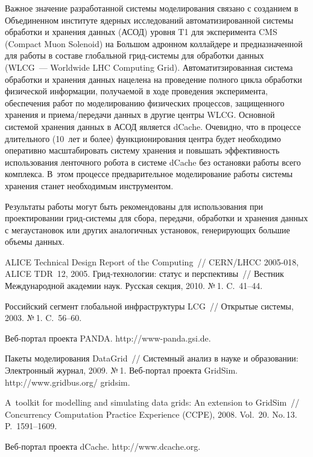 \begin{multicols}{2}
   Важное значение разработанной системы моделирования связано с 
созданием в Объединенном институте ядерных исследований 
автоматизированной системы обработки и хранения данных (АСОД) уровня T1 
для эксперимента CMS (Compact Muon Solenoid) на Большом адронном коллайдере и предназначенной 
для работы в составе глобальной грид-сис\-те\-мы для обработки данных 
(WLCG~--- Worldwide LHC Computing Grid). Автоматитзированная система обработки и хранения данных нацелена на проведение полного цикла обработки физической 
информации, получаемой в ходе проведения эксперимента, обеспечения работ 
по моделированию физических процессов, защищенного хранения и 
при\-ема/пе\-ре\-да\-чи данных в другие центры WLCG. Основной системой хранения 
данных в АСОД является dCache. Очевидно, что в процессе длительного 
(10~лет и более) функционирования центра будет необходимо оперативно 
масштабировать систему хранения и повышать эффективность использования 
ленточного робота в системе dCache без остановки работы всего комплекса. 
В~этом процессе предварительное моделирование работы системы хранения 
станет необходимым инструментом.
   
   Результаты работы могут быть рекомендованы для использования при 
проектировании грид-сис\-те\-мы для сбора, передачи, обработки и хранения 
данных с мегаустановок или других аналогичных установок, генерирующих 
большие объемы данных.

{\small\frenchspacing
{%
\begin{thebibliography}{9}
  
 ALICE Technical Design Report of the Computing~// 
CERN/LHCC 2005-018, ALICE TDR~12, 2005.
 Грид-тех\-но\-ло\-гии: статус и перспективы~// Вест\-ник 
Международной академии наук. Русская секция, 2010. №\,1. C.~41--44.

 Российский сегмент 
глобальной инфраструктуры LCG~// Открытые системы, 2003. №\,1. C.~56--60.

Веб-пор\-тал проекта PANDA. {\sf http://www-panda.gsi.de}.

 Пакеты моделирования DataGrid~// 
Сис\-тем\-ный анализ в науке и образовании: Электронный журнал, 2009. №\,1.
Веб-пор\-тал проекта GridSim. {\sf http://www.gridbus.org/ gridsim}.

 A~toolkit for 
modelling and simulating data grids: An extension to GridSim~// Concurrency  
Computation Practice Experience (CCPE), 2008. Vol.~20. No.\,13. 
P.~1591--1609.


\label{end\stat}

Веб-пор\-тал проекта dCache. {\sf http://www.dcache.org}.


\end{thebibliography}
} }

\end{multicols}